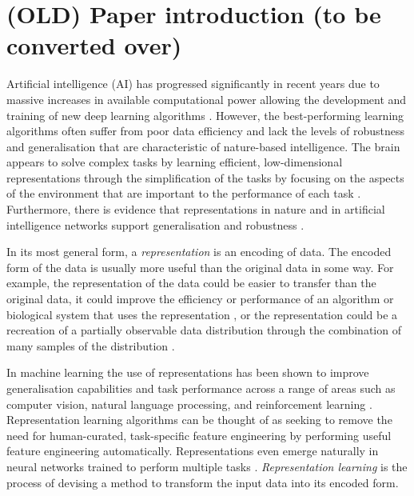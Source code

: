 \chapter{(OLD) Paper introduction (to be converted over)}

Artificial intelligence (AI) has progressed significantly in recent years due to massive increases in available computational power allowing the development and training of new deep learning algorithms \autocite{amodei2018ai,thompson2020computational}.
However, the best-performing learning algorithms often suffer from poor data efficiency and lack the levels of robustness and generalisation that are characteristic of nature-based intelligence.
The brain appears to solve complex tasks by learning efficient, low-dimensional representations through the simplification of the tasks by focusing on the aspects of the environment that are important to the performance of each task \autocite{Niv2019,mack2020ventromedial,jha2023extracting,op2001inferotemporal,shepard1987toward,edelman1997learning}.
Furthermore, there is evidence that representations in nature and in artificial intelligence networks support generalisation and robustness \autocite{flesch2022orthogonal, Bernardi2020,ito2022compositional,momennejad2020learning,lehnert2020reward,alonso2013associative,kokkola2019double}.

In its most general form, a \textit{representation} is an encoding of data.
The encoded form of the data is usually more useful than the original data in some way.
For example, the representation of the data could be easier to transfer than the original data, it could improve the efficiency or performance of an algorithm or biological system that uses the representation \autocite{Lesort2018StateRL, Bengio2013}, or the representation could be a recreation of a partially observable data distribution through the combination of many samples of the distribution \autocite{Boutilier1996, Zhang2019}.

In machine learning the use of representations has been shown to improve generalisation capabilities and task performance across a range of areas such as computer vision, natural language processing, and reinforcement learning \autocite{Bengio2013,botteghi2022unsupervised,mohamed2022self,voulodimos2018deep}.
Representation learning algorithms can be thought of as seeking to remove the need for human-curated, task-specific feature engineering by performing useful feature engineering automatically.
Representations even emerge naturally in neural networks trained to perform multiple tasks \autocite{Johnston2023}.
\textit{Representation learning} is the process of devising a method to transform the input data into its encoded form.

